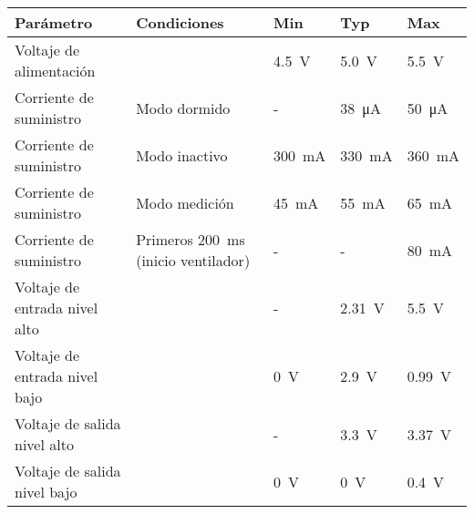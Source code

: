 \begin{tabular}{p{4.4cm}p{}lll}
	\toprule
	\textbf{Parámetro} & \textbf{Condiciones} & \textbf{Min} & \textbf{Typ} & \textbf{Max} \\ 
	\midrule
	Voltaje de alimentación & & \SI{4.5}{\volt} & \SI{5.0}{\volt} & \SI{5.5}{\volt} \\
	Corriente de suministro & Modo dormido & - & \SI{38}{\micro\ampere} & \SI{50}{\micro\ampere} \\ 
	Corriente de suministro & Modo inactivo & \SI{300}{\milli\ampere} & \SI{330}{\milli\ampere} & \SI{360}{\milli\ampere} \\ 
	Corriente de suministro & Modo medición & \SI{45}{\milli\ampere} & \SI{55}{\milli\ampere} & \SI{65}{\milli\ampere} \\ 
	Corriente de suministro & Primeros \SI{200}{\milli\second} (inicio ventilador) & - & - & \SI{80}{\milli\ampere} \\ 
	Voltaje de entrada nivel alto & & - & \SI{2.31}{\volt} & \SI{5.5}{\volt} \\ 
	Voltaje de entrada nivel bajo & & \SI{0}{\volt} & \SI{2.9}{\volt} & \SI{0.99}{\volt} \\ 
	Voltaje de salida nivel alto & & - & \SI{3.3}{\volt} & \SI{3.37}{\volt} \\ 
	Voltaje de salida nivel bajo & & \SI{0}{\volt} & \SI{0}{\volt} & \SI{0.4}{\volt} \\ 
	\bottomrule
\end{tabular}
